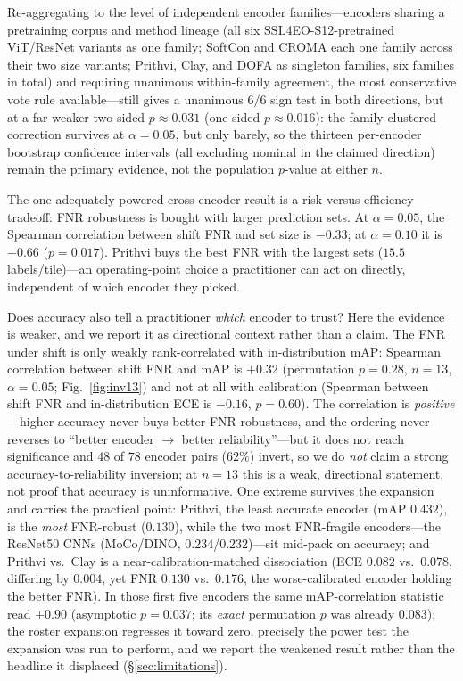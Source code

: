 \documentclass[preprint,11pt,authoryear]{elsarticle}
\begin{document}
Re-aggregating to the level of independent encoder families---encoders sharing a pretraining
corpus and method lineage (all six SSL4EO-S12-pretrained ViT/ResNet variants as one family; SoftCon
and CROMA each one family across their two size variants; Prithvi, Clay, and DOFA as singleton
families, six families in total) and requiring unanimous within-family agreement, the most
conservative vote rule available---still gives a unanimous $6/6$ sign test in both directions, but
at a far weaker two-sided $p\approx0.031$ (one-sided $p\approx0.016$): the family-clustered
correction survives at $\alpha{=}0.05$, but only barely, so the thirteen per-encoder bootstrap
confidence intervals (all excluding nominal in the claimed direction) remain the primary evidence,
not the population $p$-value at either $n$.

The one adequately powered cross-encoder result is a risk-versus-efficiency tradeoff: FNR robustness is
bought with larger prediction sets. At $\alpha{=}0.05$, the Spearman correlation between shift FNR and
set size is $-0.33$; at $\alpha{=}0.10$ it is $-0.66$ ($p{=}0.017$). Prithvi buys the best FNR with the
largest sets ($15.5$ labels/tile)---an operating-point choice a practitioner can act on directly,
independent of which encoder they picked.

Does accuracy also tell a practitioner \emph{which} encoder to trust? Here the evidence is weaker, and we
report it as directional context rather than a claim. The FNR under shift is only weakly rank-correlated
with in-distribution mAP: Spearman correlation between shift FNR and mAP is $+0.32$ (permutation
$p{=}0.28$, $n{=}13$, $\alpha{=}0.05$; Fig.~\ref{fig:inv13}) and not at all with calibration
(Spearman between shift FNR and in-distribution ECE is $-0.16$, $p{=}0.60$). The
correlation is \emph{positive}---higher accuracy never buys better FNR robustness, and the ordering never
reverses to ``better encoder $\to$ better reliability''---but it does not reach significance and $48$ of
$78$ encoder pairs ($62\%$) invert, so we do \emph{not} claim a strong accuracy-to-reliability inversion;
at $n{=}13$ this is a weak, directional statement, not proof that accuracy is uninformative. One extreme
survives the expansion and carries the practical point: Prithvi, the least accurate encoder (mAP
$0.432$), is the \emph{most} FNR-robust ($0.130$), while the two most FNR-fragile encoders---the ResNet50
CNNs (MoCo/DINO, $0.234$/$0.232$)---sit mid-pack on accuracy; and Prithvi vs.\ Clay is a
near-calibration-matched dissociation (ECE $0.082$ vs.\ $0.078$, differing by $0.004$, yet FNR $0.130$
vs.\ $0.176$, the worse-calibrated encoder holding the better FNR). In those first five encoders the same
mAP-correlation statistic read $+0.90$ (asymptotic $p{=}0.037$; its \emph{exact} permutation $p$ was
already $0.083$); the roster expansion regresses it toward zero, precisely the power test the expansion
was run to perform, and we report the weakened result rather than the headline it displaced
(\S\ref{sec:limitations}).
\end{document}
